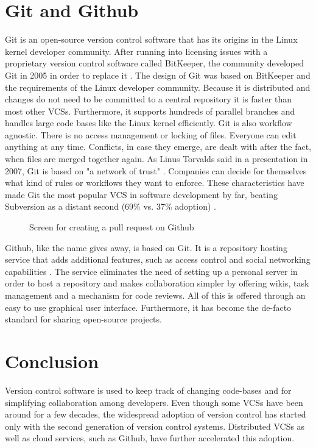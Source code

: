 \section{Git and Github}
Git is an open-source version control software that has its origins in the Linux kernel developer community. After running into licensing issues with a proprietary version control software called BitKeeper, the community developed Git in 2005 in order to replace it \cite{chacon_pro_2009, ruparelia_history_2010}. The design of Git was based on BitKeeper and the requirements of the Linux developer community. Because it is distributed and changes do not need to be committed to a central repository it is faster than most other VCSs. Furthermore, it supports hundreds of parallel branches and handles large code bases like the Linux kernel efficiently. Git is also workflow agnostic. There is no access management or locking of files. Everyone can edit anything at any time. Conflicts, in case they emerge, are dealt with after the fact, when files are merged together again. As Linus Torvalds said in a presentation in 2007, Git is based on "a network of trust" \cite{_linus_2007}. Companies can decide for themselves what kind of rules or workflows they want to enforce. These characteristics have made Git the most popular VCS in software development by far, beating Subversion as a distant second (69\% vs. 37\% adoption) \cite{_stack_2015}.

\begin{figure}[h!]
 \centering
 \caption{Screen for creating a pull request on Github}
 \label{fig:github-pr}
\end{figure}

Github, like the name gives away, is based on Git. It is a repository hosting service that adds additional features, such as access control and social networking capabilities \cite{finley_what_2012}. The service eliminates the need of setting up a personal server in order to host a  repository and makes collaboration simpler by offering wikis, task management and a mechanism for code reviews. All of this is offered through an easy to use graphical user interface. Furthermore, it has become the de-facto standard for sharing open-source projects.

\section{Conclusion}
Version control software is used to keep track of changing code-bases and for simplifying collaboration among developers. Even though some VCSs have been around for a few decades, the widespread adoption of version control has started only with the second generation of version control systems. Distributed VCSs as well as cloud services, such as Github, have further accelerated this adoption.

